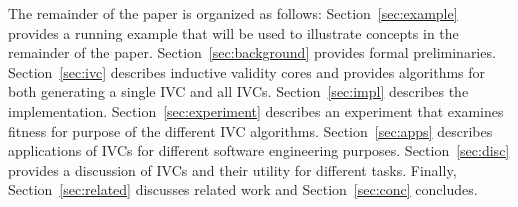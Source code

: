 The remainder of the paper is organized as follows: Section~\ref{sec:example} provides a running example that will be used to illustrate concepts in the remainder of the paper.  Section~\ref{sec:background} provides formal preliminaries.  Section~\ref{sec:ivc} describes inductive validity cores and provides algorithms for both generating a single IVC and all IVCs.  Section~\ref{sec:impl} describes the implementation.  Section~\ref{sec:experiment} describes an experiment that examines fitness for purpose of the different IVC algorithms.  Section~\ref{sec:apps} describes applications of IVCs for different software engineering purposes.   Section~\ref{sec:disc} provides a discussion of IVCs and their utility for different tasks. Finally, Section~\ref{sec:related} discusses related work and Section~\ref{sec:conc} concludes.

